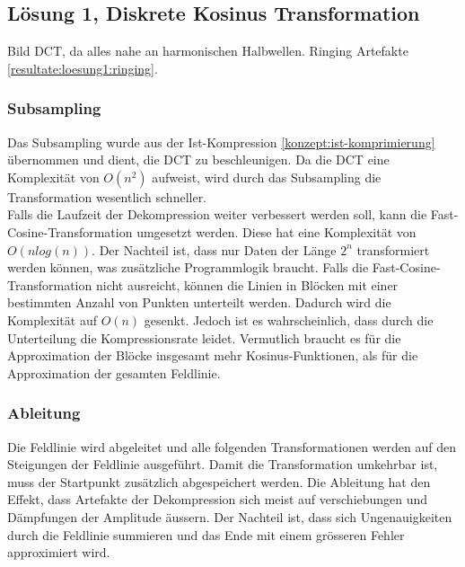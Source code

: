 \subsection{Lösung 1, Diskrete Kosinus Transformation}
Bild
DCT, da alles nahe an harmonischen Halbwellen. 
Ringing Artefakte \ref{resultate:loesung1:ringing}. 

\subsubsection{Subsampling} \label{konzept:loesung1:subsampling}
Das Subsampling wurde aus der Ist-Kompression \ref{konzept:ist-komprimierung} übernommen und dient, die DCT zu beschleunigen. Da die DCT eine Komplexität von $O(n^2)$ aufweist, wird durch das Subsampling die Transformation wesentlich schneller.\\
Falls die Laufzeit der Dekompression weiter verbessert werden soll, kann die Fast-Cosine-Transformation umgesetzt werden. Diese hat eine Komplexität von $O(n log(n))$. Der Nachteil ist, dass nur Daten der Länge $2^n$ transformiert werden können, was zusätzliche Programmlogik braucht. Falls die Fast-Cosine-Transformation nicht ausreicht, können die Linien in Blöcken mit einer bestimmten Anzahl von Punkten unterteilt werden. Dadurch wird die Komplexität auf $O(n)$ gesenkt. Jedoch ist es wahrscheinlich, dass durch die Unterteilung die Kompressionsrate leidet. Vermutlich braucht es für die Approximation der Blöcke insgesamt mehr Kosinus-Funktionen, als für die Approximation der gesamten Feldlinie.

\subsubsection{Ableitung}
Die Feldlinie wird abgeleitet und alle folgenden Transformationen werden auf den Steigungen der Feldlinie ausgeführt. Damit die Transformation umkehrbar ist, muss der Startpunkt zusätzlich abgespeichert werden. Die Ableitung hat den Effekt, dass Artefakte der Dekompression sich meist auf verschiebungen und Dämpfungen der Amplitude äussern. Der Nachteil ist, dass sich Ungenauigkeiten durch die Feldlinie summieren und das Ende mit einem grösseren Fehler approximiert wird.

